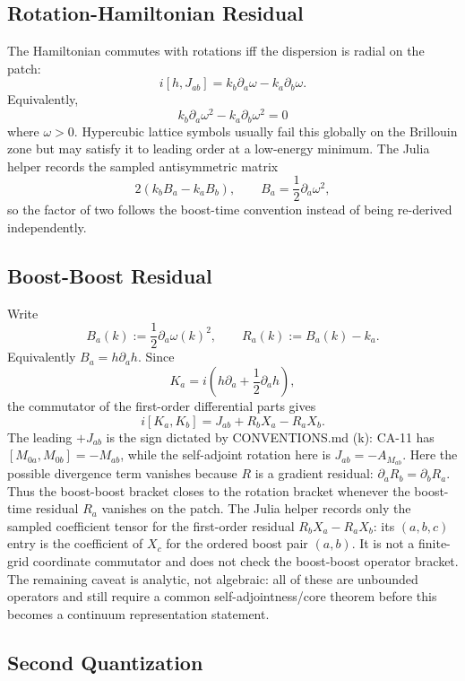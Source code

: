 \subsection{Rotation-Hamiltonian Residual}

The Hamiltonian commutes with rotations iff the dispersion is radial on the
patch:
\[
  i[h,J_{ab}]
  =
  k_b\partial_a\omega-k_a\partial_b\omega.
\]
Equivalently,
\[
  k_b\partial_a\omega^2-k_a\partial_b\omega^2=0
\]
where \(\omega>0\).  Hypercubic lattice symbols usually fail this globally on
the Brillouin zone but may satisfy it to leading order at a low-energy minimum.
The Julia helper records the sampled antisymmetric matrix
\[
  2(k_bB_a-k_aB_b),
  \qquad B_a=\frac12\partial_a\omega^2,
\]
so the factor of two follows the boost-time convention instead of being
re-derived independently.

\subsection{Boost-Boost Residual}

Write
\[
  B_a(k):=\frac{1}{2}\partial_a\omega(k)^2,
  \qquad
  R_a(k):=B_a(k)-k_a.
\]
Equivalently \(B_a=h\partial_a h\).  Since
\[
  K_a=i\left(h\partial_a+\frac{1}{2}\partial_ah\right),
\]
the commutator of the first-order differential parts gives
\[
  i[K_a,K_b]
  =
  J_{ab}+R_bX_a-R_aX_b.
\]
The leading \(+J_{ab}\) is the sign dictated by CONVENTIONS.md (k): CA-11 has
\([M_{0a},M_{0b}]=-M_{ab}\), while the self-adjoint rotation here is
\(J_{ab}=-A_{M_{ab}}\).
Here the possible divergence term vanishes because \(R\) is a gradient
residual:
\(\partial_aR_b=\partial_bR_a\).  Thus the boost-boost bracket closes to the
rotation bracket whenever the boost-time residual \(R_a\) vanishes on the patch.
The Julia helper records only the sampled coefficient tensor for the
first-order residual \(R_bX_a-R_aX_b\): its \((a,b,c)\) entry is the coefficient
of \(X_c\) for the ordered boost pair \((a,b)\).  It is not a finite-grid
coordinate commutator and does not check the boost-boost operator bracket.  The
remaining caveat is analytic, not algebraic: all of these are unbounded
operators and still require a common self-adjointness/core theorem before this
becomes a continuum representation statement.

\subsection{Second Quantization}

